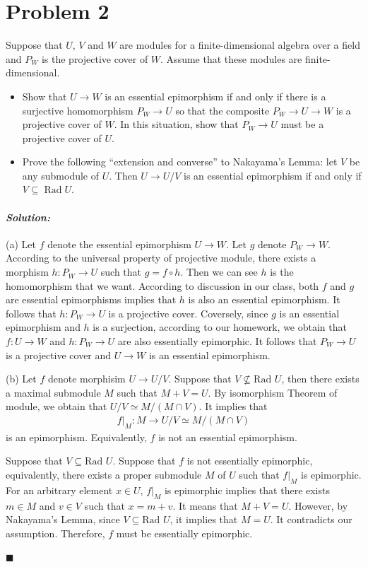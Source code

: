 \documentclass[12pt, a4paper]{article}
\theoremstyle{remark}
\newenvironment{solution}
  {\paragraph{\textit{Solution:}}\par\medskip}
  {\hfill$\blacksquare$\vspace{0.1cm}}
\begin{document}
\section*{Problem 2}
Suppose that $U$, $V$ and $W$ are modules for a finite-dimensional algebra over a field and $P_W$ is the projective cover of $W$. Assume that these modules are finite-dimensional.
\begin{itemize}
    \item[(a)] Show that $U \to W$ is an essential epimorphism if and only if there is a surjective homomorphism $P_W \to U$ so that the composite $P_W \to U \to W$ is a projective cover of $W$. In this situation, show that $P_W \to U$ must be a projective cover of $U$.
    \item[(b)] Prove the following ``extension and converse'' to Nakayama's Lemma: let $V$ be any submodule of $U$. Then $U \to U/V$ is an essential epimorphism if and only if $V \subseteq \operatorname{Rad} U$.
\end{itemize}
\begin{solution}
    (a) Let $f$ denote the essential epimorphism $U\to W$. Let $g$ denote $P_W\to W$. According to the universal property of projective module, there exists a morphism $h:P_W\to U$ such that $g=f\circ h$. Then we can see $h$ is the homomorphism that we want.  
    According to discussion in our class, both $f$ and $g$ are essential epimorphisms implies that $h$ is also an essential epimorphism. 
    It follows that $h:P_W\to U$ is a projective cover.
    Coversely, since $g$ is an essential epimorphism and $h$ is a surjection, according to our homework, we obtain that $f:U\to W$ and $h:P_W\to U$ are also essentially epimorphic.
    It follows that $P_W\to U$ is a projective cover and $U\to W$ is an essential epimorphism.

    (b) Let $f$ denote morphisim $U\to U/V$.
    Suppose that $V \not \subseteq \text{Rad }U$, then there exists a maximal submodule $M$ such that $M+V= U$. By isomorphism Theorem of module, we obtain that $U/V \simeq M/(M\cap V)$. It implies that 
    \begin{align*}
        f|_M:M \to U/V\simeq M/(M\cap V)
    \end{align*}
    is an epimorphism. Equivalently, $f$ is not an essential epimorphism.


    Suppose that $V\subseteq \text{Rad }U$. Suppose that $f$ is not essentially epimorphic, equivalently, there exists a proper submodule $M$ of $U$ such that $f|_{M}$ is epimorphic.
    For an arbitrary element $x\in U$, $f|_M$ is epimorphic implies that there exists $m\in M$ and $v\in V$ such that $x=m+v$.
    It means that $M+V=U$. However, by Nakayama's Lemma, since $V\subseteq \text{Rad }U$, it implies that $M=U$. It contradicts our assumption. Therefore, $f$ must be essentially epimorphic.

\end{solution}
\end{document}
